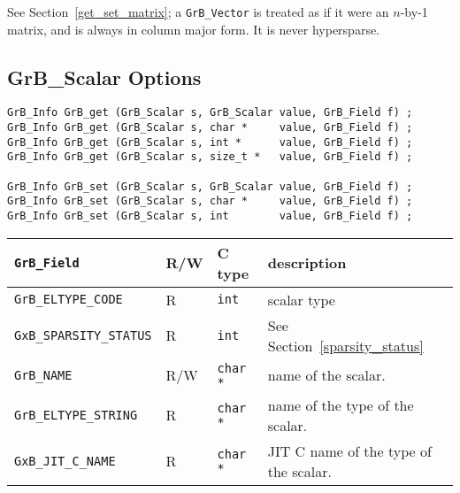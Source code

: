 See Section~\ref{get_set_matrix}; a \verb'GrB_Vector' is treated as if it were
an $n$-by-1 matrix, and is always in column major form.  It is never
hypersparse.

\subsection{{\sf GrB\_Scalar} Options}
\label{get_set_scalar}

\begin{mdframed}[userdefinedwidth=6in]
{\footnotesize
\begin{verbatim}
GrB_Info GrB_get (GrB_Scalar s, GrB_Scalar value, GrB_Field f) ;
GrB_Info GrB_get (GrB_Scalar s, char *     value, GrB_Field f) ;
GrB_Info GrB_get (GrB_Scalar s, int *      value, GrB_Field f) ;
GrB_Info GrB_get (GrB_Scalar s, size_t *   value, GrB_Field f) ;

GrB_Info GrB_set (GrB_Scalar s, GrB_Scalar value, GrB_Field f) ;
GrB_Info GrB_set (GrB_Scalar s, char *     value, GrB_Field f) ;
GrB_Info GrB_set (GrB_Scalar s, int        value, GrB_Field f) ;
\end{verbatim}
}\end{mdframed}

\noindent
{\small
\begin{tabular}{|l|l|l|p{3in}|}
\hline
\verb'GrB_Field'                    & R/W  & C type        & description \\
\hline

\verb'GrB_ELTYPE_CODE'              & R    & \verb'int'    & scalar type \\
\verb'GxB_SPARSITY_STATUS'          & R    & \verb'int'    & See Section~\ref{sparsity_status} \\
\hline
\verb'GrB_NAME'                     & R/W  & \verb'char *' & name of the scalar. \\
\verb'GrB_ELTYPE_STRING'            & R    & \verb'char *' & name of the type of the scalar. \\
\verb'GxB_JIT_C_NAME'               & R    & \verb'char *' & JIT C name of the type of the scalar. \\
\hline
\end{tabular}
}
\vspace{0.1in}


